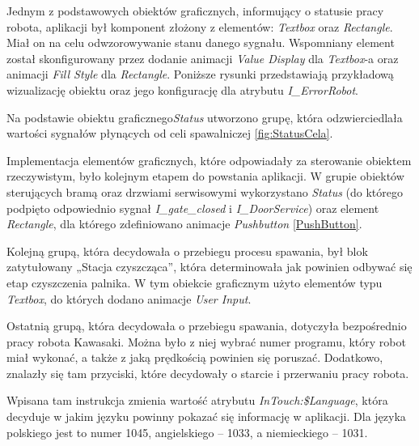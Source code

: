
Jednym z podstawowych obiektów graficznych, informujący o statusie pracy robota, aplikacji był komponent złożony z elementów: \textit{Textbox} oraz \textit{Rectangle}. Miał on na celu odwzorowywanie stanu danego sygnału. Wspomniany element został skonfigurowany przez dodanie animacji \textit{Value Display} dla \textit{Textbox}-a oraz animacji \textit{Fill Style} dla \textit{Rectangle}. Poniższe rysunki przedstawiają  przykładową wizualizację obiektu oraz jego konfigurację dla atrybutu \textit{I\_ErrorRobot}. 




Na podstawie obiektu graficznego\textit{Status} utworzono grupę, która odzwierciedlała wartości sygnałów płynących od celi spawalniczej \ref{fig:StatusCela}.



Implementacja elementów graficznych, które odpowiadały za sterowanie obiektem rzeczywistym, było kolejnym etapem do powstania aplikacji. W grupie obiektów sterujących bramą oraz drzwiami serwisowymi wykorzystano \textit{Status} (do którego podpięto odpowiednio sygnał \textit{I\_gate\_closed} i \textit{I\_DoorService}) oraz element \textit{Rectangle}, dla którego zdefiniowano animacje \textit{Pushbutton} \ref{PushButton}. 


Kolejną grupą, która decydowała o przebiegu procesu spawania, był blok zatytułowany „Stacja czyszcząca”, która determinowała jak powinien odbywać się etap czyszczenia palnika. W tym obiekcie graficznym użyto elementów typu \textit{Textbox}, do których dodano animacje \textit{User Input}. 



Ostatnią grupą, która decydowała o przebiegu spawania, dotyczyła bezpośrednio pracy robota Kawasaki. Można było z niej wybrać numer programu, który robot miał wykonać, a także z jaką prędkością powinien się poruszać. Dodatkowo, znalazły się tam przyciski, które decydowały o starcie i przerwaniu pracy robota. 


Wpisana tam instrukcja zmienia wartość atrybutu \textit{InTouch:\$Language}, która decyduje w jakim języku powinny pokazać się informację w aplikacji. Dla języka polskiego jest to numer 1045, angielskiego – 1033, a niemieckiego – 1031. 


